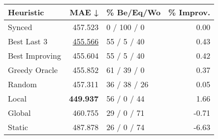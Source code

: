 \begin{tabular}{lrlr}
\toprule
\textbf{Heuristic} & \textbf{MAE ↓} & \textbf{\% Be/Eq/Wo} & \textbf{\% Improv.} \\
\midrule
            Synced &        457.523 &          0 / 100 / 0 &                0.00 \\
\midrule
       Best Last 3 &        \underline{455.566} &          55 / 5 / 40 &                0.43 \\
    Best Improving &        455.604 &          55 / 5 / 40 &                0.42 \\
\addlinespace
     Greedy Oracle &        455.852 &          61 / 39 / 0 &                0.37 \\
            Random &        457.311 &         36 / 38 / 26 &                0.05 \\
\midrule
             Local &        \textbf{449.937} &          56 / 0 / 44 &                1.66 \\
            Global &        460.755 &          29 / 0 / 71 &               -0.71 \\
\midrule
            Static &        487.878 &          26 / 0 / 74 &               -6.63 \\
\bottomrule
\end{tabular}

\label{tab:non_lr01_le2_bs4_Summary}
